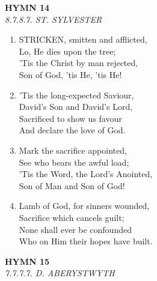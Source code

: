 \documentclass[11pt,a4paper]{article}
\begin{document}
\newpage
\begin{center}
    {\Large \textbf{HYMN 14}}
    \\
    \textit{8.7.8.7. ST. SYLVESTER}
\end{center}
\vspace{1em}

\begin{enumerate}
    \item STRICKEN, smitten and afflicted, \\
        Lo, He dies upon the tree; \\
        'Tis the Christ by man rejected, \\
        Son of God, 'tis He, 'tis He!

    \item 'Tis the long-expected Saviour, \\
        David's Son and David's Lord, \\
        Sacrificed to show us favour \\
        And declare the love of God.

    \item Mark the sacrifice appointed, \\
        See who bears the awful load; \\
        'Tis the Word, the Lord's Anointed, \\
        Son of Man and Son of God!

    \item Lamb of God, for sinners wounded, \\
        Sacrifice which cancels guilt; \\
        None shall ever be confounded \\
        Who on Him their hopes have built.

\end{enumerate}

\newpage
\begin{center}
    {\Large \textbf{HYMN 15}}
    \\
    \textit{7.7.7.7. D. ABERYSTWYTH}
\end{center}
\vspace{1em}
\end{document}
